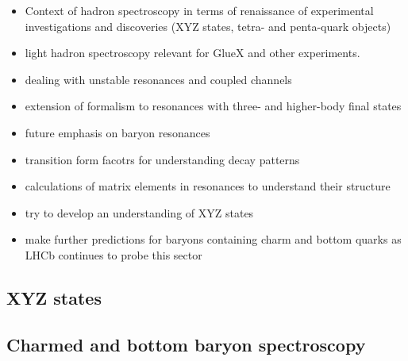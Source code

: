
\begin{itemize}
	\item Context of hadron spectroscopy in terms of renaissance of experimental investigations and discoveries (XYZ states, tetra- and penta-quark objects)
	\item light hadron spectroscopy relevant for GlueX and other experiments. 
	\item dealing with unstable resonances and coupled channels
	\item extension of formalism to resonances with  three- and higher-body final states
	\item future emphasis on baryon resonances
	\item transition form facotrs for understanding decay patterns
	\item calculations of matrix elements in resonances to understand their structure
	\item try to develop an understanding of XYZ states
	\item make further predictions for baryons containing charm and bottom quarks as LHCb continues to probe this sector
\end{itemize}











\subsection{XYZ states}

\subsection{Charmed and bottom baryon spectroscopy}

